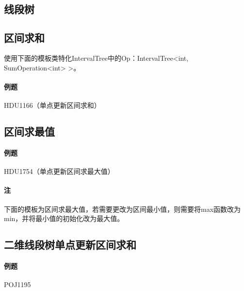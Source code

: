 \subsection{线段树}


\subsection{区间求和}

使用下面的模板类特化IntervalTree中的Op：IntervalTree<int, SumOperation<int> >。

\paragraph{例题} HDU1166（单点更新区间求和）



\subsection{区间求最值}

\paragraph{例题} HDU1754（单点更新区间求最大值）

\paragraph{注} 下面的模板为区间求最大值，若需要更改为区间最小值，则需要将max函数改为min，并将最小值的初始化改为最大值。



\subsection{二维线段树单点更新区间求和}

\paragraph{例题} POJ1195


